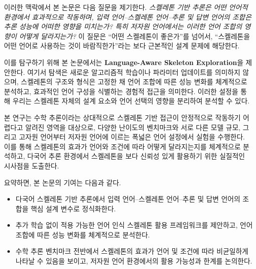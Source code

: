 이러한 맥락에서 본 논문은 다음 질문을 제기한다. \textit{스켈레톤 기반 추론은 어떤 언어적 환경에서 효과적으로 작동하며, 입력 언어–스켈레톤 언어–추론 및 답변 언어의 조합은 추론 성능에 어떠한 영향을 미치는가? 특히 저자원 언어에서는 이러한 언어 조합의 영향이 어떻게 달라지는가?} 이 질문은 “어떤 스켈레톤이 좋은가”를 넘어서, ``스켈레톤을 어떤 언어로 사용하는 것이 바람직한가''라는 보다 근본적인 설계 문제에 해당한다.

이를 탐구하기 위해 본 논문에서는 \textbf{Language-Aware Skeleton Exploration}을 제안한다. 여기서 탐색은 새로운 알고리즘적 학습이나 파라미터 업데이트를 의미하지 않으며, 스켈레톤의 구조와 형식은 고정한 채 언어 조합에 따른 성능 변화를 체계적으로 분석하고, 효과적인 언어 구성을 식별하는 경험적 접근을 의미한다. 이러한 설정을 통해 우리는 스켈레톤 자체의 설계 요소와 언어 선택의 영향을 분리하여 분석할 수 있다.


본 연구는 수학 추론이라는 상대적으로 스켈레톤 기반 접근이 안정적으로 작동하기 어렵다고 알려진 영역을 대상으로, 다양한 난이도의 벤치마크와 서로 다른 모델 규모, 그리고 고자원 언어부터 저자원 언어에 이르는 폭넓은 언어 설정에서 실험을 수행한다. 이를 통해 스켈레톤의 효과가 언어와 조건에 따라 어떻게 달라지는지를 체계적으로 분석하고, 다국어 추론 환경에서 스켈레톤을 보다 신뢰성 있게 활용하기 위한 실질적인 시사점을 도출한다.

요약하면, 본 논문의 기여는 다음과 같다.
\begin{itemize}
    \item 다국어 스켈레톤 기반 추론에서 입력 언어–스켈레톤 언어–추론 및 답변 언어의 조합을 핵심 설계 변수로 정식화한다.
    \item 추가 학습 없이 적용 가능한 언어 인식 스켈레톤 활용 프레임워크를 제안하고, 언어 조합에 따른 성능 변화를 체계적으로 분석한다.
    \item 수학 추론 벤치마크 전반에서 스켈레톤의 효과가 언어 및 조건에 따라 비균일하게 나타날 수 있음을 보이고, 저자원 언어 환경에서의 활용 가능성과 한계를 논의한다.
\end{itemize}
